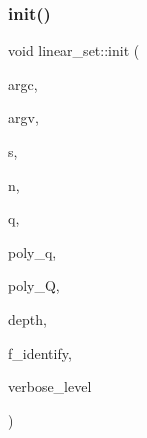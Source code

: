 \subsubsection{\texorpdfstring{init()}{init()}}
{\footnotesize\ttfamily void linear\+\_\+set\+::init (\begin{DoxyParamCaption}\item[{int}]{argc,  }\item[{const char $\ast$$\ast$}]{argv,  }\item[{\mbox{\hyperlink{galois_8h_a09fddde158a3a20bd2dcadb609de11dc}{I\+NT}}}]{s,  }\item[{\mbox{\hyperlink{galois_8h_a09fddde158a3a20bd2dcadb609de11dc}{I\+NT}}}]{n,  }\item[{\mbox{\hyperlink{galois_8h_a09fddde158a3a20bd2dcadb609de11dc}{I\+NT}}}]{q,  }\item[{const \mbox{\hyperlink{galois_8h_ab6cc7b4aeb6ea31aba2b3fbfc83ff5e6}{B\+Y\+TE}} $\ast$}]{poly\+\_\+q,  }\item[{const \mbox{\hyperlink{galois_8h_ab6cc7b4aeb6ea31aba2b3fbfc83ff5e6}{B\+Y\+TE}} $\ast$}]{poly\+\_\+Q,  }\item[{\mbox{\hyperlink{galois_8h_a09fddde158a3a20bd2dcadb609de11dc}{I\+NT}}}]{depth,  }\item[{\mbox{\hyperlink{galois_8h_a09fddde158a3a20bd2dcadb609de11dc}{I\+NT}}}]{f\+\_\+identify,  }\item[{\mbox{\hyperlink{galois_8h_a09fddde158a3a20bd2dcadb609de11dc}{I\+NT}}}]{verbose\+\_\+level }\end{DoxyParamCaption})}

\mbox{\label{classlinear__set_a0cc3eaec1896fdc977b62e94623b055b}} 
